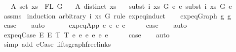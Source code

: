 \begin{isabellebody}
\ \ \ A{}{\isacharcolon}{\kern0pt}\ {\isachardoublequoteopen}set\ xs\ {\isacharequal}{\kern0pt}\ FL\ G{\isachardoublequoteclose}\isanewline
\ \ \ A{}{\isacharcolon}{\kern0pt}\ {\isachardoublequoteopen}distinct\ xs{\isachardoublequoteclose}\isanewline
\ \ \ {\isachardoublequoteopen}subst\ i\ xs\ G\ e{}\ {\isasymsimeq}e\ subst\ i\ xs\ G\ e{}{\isachardoublequoteclose}\isanewline
%
\isadelimproof
%
\endisadelimproof
%
\isatagproof
{}\isamarkupfalse%
\ assms\isanewline
{}\isamarkupfalse%
\ {\isacharparenleft}{\kern0pt}induction\ arbitrary{\isacharcolon}{\kern0pt}\ i\ xs\ G\ rule{\isacharcolon}{\kern0pt}\ expeq{\isachardot}{\kern0pt}induct{\isacharparenright}{\kern0pt}\isanewline
\ \ \isamarkupfalse%
\ {\isacharparenleft}{\kern0pt}expeq{\isacharunderscore}{\kern0pt}Graph\ g{}\ g{}{\isacharparenright}{\kern0pt}\isanewline
\ \ \isamarkupfalse%
\ \isamarkupfalse%
\ {\isacharquery}{\kern0pt}case\isanewline
\ \ \isamarkupfalse%
\ auto\isanewline
\ \ \isamarkupfalse%
\isanewline
{}\isamarkupfalse%
\isanewline
\ \ \isamarkupfalse%
\ {\isacharparenleft}{\kern0pt}expeq{\isacharunderscore}{\kern0pt}App\ e{}{}\ e{}{}\ e{}{}\ e{}{}{\isacharparenright}{\kern0pt}\isanewline
\ \ \isamarkupfalse%
\ \isamarkupfalse%
\ {\isacharquery}{\kern0pt}case\isanewline
\ \ \isamarkupfalse%
\ auto\isanewline
\ \ \isamarkupfalse%
\isanewline
{}\isamarkupfalse%
\isanewline
\ \ \isamarkupfalse%
\ {\isacharparenleft}{\kern0pt}expeq{\isacharunderscore}{\kern0pt}Case\ E{}\ E{}\ T{}\ T{}\ e{}{}\ e{}{}\ e{}{}\ e{}{}\ e{}{}\ e{}{}{\isacharparenright}{\kern0pt}\isanewline
\ \ \isamarkupfalse%
\ \isamarkupfalse%
\ {\isacharquery}{\kern0pt}case\isanewline
\ \ \isamarkupfalse%
\ auto\isanewline
\ \ \isamarkupfalse%
\ {\isacharparenleft}{\kern0pt}simp\ add{\isacharcolon}{\kern0pt}\ e{\isacharunderscore}{\kern0pt}Case\ lifts{\isacharunderscore}{\kern0pt}graph{\isacharunderscore}{\kern0pt}freelinks{\isacharparenright}{\kern0pt}\isanewline

\end{isabellebody}
